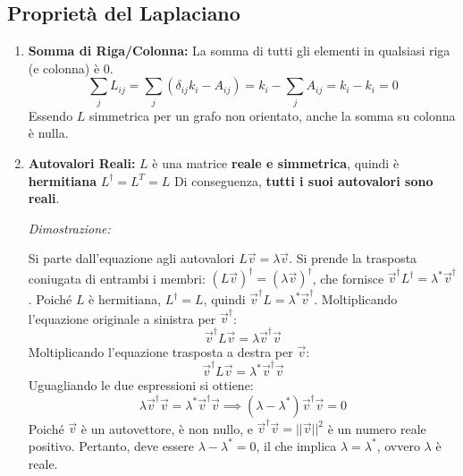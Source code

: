 	\subsection{Proprietà del Laplaciano}
	\begin{enumerate}
		\item \textbf{Somma di Riga/Colonna:} La somma di tutti gli elementi in qualsiasi riga (e colonna) è 0.
        \begin{equation}
            \sum_{j} L_{ij} = \sum_{j} (\delta_{ij}k_i - A_{ij}) = k_i - \sum_{j} A_{ij} = k_i - k_i = 0
        \end{equation}
		Essendo $L$ simmetrica per un grafo non orientato, anche la somma su colonna è nulla.
		
		\item \textbf{Autovalori Reali:} $L$ è una matrice \textbf{reale e simmetrica}, quindi è \textbf{hermitiana} 
        $L^\dagger = L^T = L$
        Di conseguenza, \textbf{tutti i suoi autovalori sono reali}.
		
		\textit{Dimostrazione:}
        
		Si parte dall'equazione agli autovalori $L\vec{v} = \lambda\vec{v}$.
		Si prende la trasposta coniugata di entrambi i membri: $(L\vec{v})^\dagger = (\lambda\vec{v})^\dagger$, che fornisce $\vec{v}^\dagger L^\dagger = \lambda^* \vec{v}^\dagger$.
		Poiché $L$ è hermitiana, $L^\dagger = L$, quindi $\vec{v}^\dagger L = \lambda^* \vec{v}^\dagger$.
		Moltiplicando l'equazione originale a sinistra per $\vec{v}^\dagger$:
        \begin{equation}
            \vec{v}^\dagger L \vec{v} = \lambda \vec{v}^\dagger \vec{v}
        \end{equation}
		Moltiplicando l'equazione trasposta a destra per $\vec{v}$:
        \begin{equation}
           \vec{v}^\dagger L \vec{v} = \lambda^* \vec{v}^\dagger \vec{v} 
        \end{equation}
		Uguagliando le due espressioni si ottiene:
        \begin{equation}
            \lambda \vec{v}^\dagger \vec{v} = \lambda^* \vec{v}^\dagger \vec{v} \implies (\lambda - \lambda^*) \vec{v}^\dagger \vec{v} = 0
        \end{equation}
		Poiché $\vec{v}$ è un autovettore, è non nullo, e $\vec{v}^\dagger \vec{v} = ||\vec{v}||^2$ è un numero reale positivo.
		Pertanto, deve essere $\lambda - \lambda^* = 0$, il che implica $\lambda = \lambda^*$, ovvero $\lambda$ è reale.
		

\end{enumerate}
